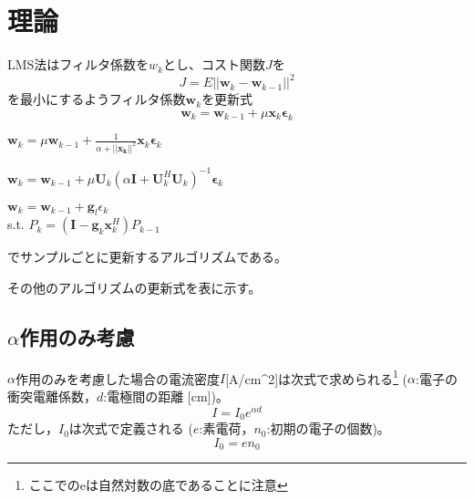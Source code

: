 \documentclass[a4paper, twocolumn]{ltjsarticle}
\begin{document}



\section{理論}
  LMS法はフィルタ係数を$w_k$とし、コスト関数$J$を
  \begin{equation}
    J = E||\symbf{w}_k - \symbf{w}_{k-1}||^2 
    \label{equation:cost}
  \end{equation}
  を最小にするようフィルタ係数$\symbf{w}_k$を更新式
  \begin{equation}
    \symbf{w}_k = \symbf{w}_{k-1} + \mu \symbf{x}_k \symbf{\epsilon}_k
    \label{equation:lms}
  \end{equation}

  \( \symbf{w}_k = \mu \symbf{w}_{k-1} + \frac{1}{\alpha + ||\symbf{x_k}||^2}\symbf{x}_k \symbf{\epsilon}_k \)

  \(\symbf{w}_k = \symbf{w}_{k-1} + \mu \symbf{U}_k \left( \alpha \symbf{I} + \symbf{U}_k^H \symbf{U}_k \right)^{-1} \symbf{\epsilon}_k\) 

  \(\symbf{w}_k = \symbf{w}_{k-1} +  \symbf{g}_l \epsilon_k \) \\
  s.t. \(P_k = ( \symbf{I} - \symbf{g}_k \symbf{x}_k^H) P_{k-1}\)

  でサンプルごとに更新するアルゴリズムである。

  その他のアルゴリズムの更新式を表\label{tab:algorithm}に示す。

  \subsection*{\(\alpha\)作用のみ考慮}
    \(\alpha\)作用のみを考慮した場合の電流密度\(I\)[A/cm^2]は次式で求められる\footnote{ここでのeは自然対数の底であることに注意} (\(\alpha\):電子の衝突電離係数，\(d\):電極間の距離 [cm])｡
    \begin{equation}
      I = I_0 e^{\alpha d} 
      \label{equation:alpha_I}
    \end{equation}
    ただし，\(I_0\)は次式で定義される (\(e\):素電荷，\(n_0\):初期の電子の個数)｡
    \begin{equation}
      I_0 = e n_0
      \label{equation:I_0}
    \end{equation}
\end{document}
